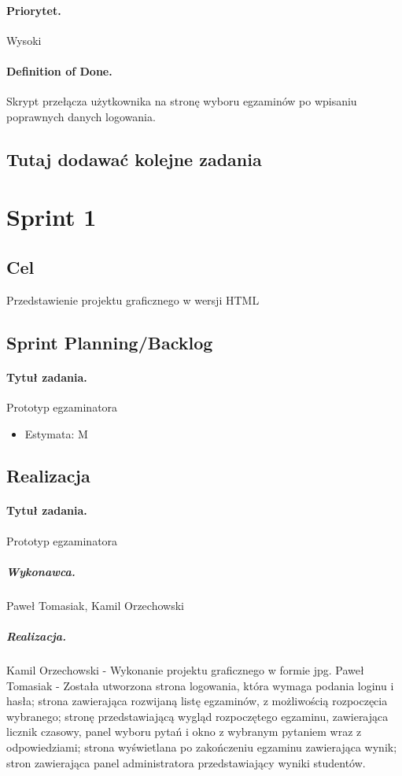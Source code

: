 \documentclass[a4paper]{article}
\begin{document}
\paragraph{Priorytet.} Wysoki
\paragraph{Definition of Done.} Skrypt przełącza użytkownika na stronę wyboru egzaminów po wpisaniu poprawnych danych logowania. 

\subsection*{Tutaj dodawać kolejne zadania}

\section{Sprint 1} 
\subsection{Cel} Przedstawienie projektu graficznego w wersji HTML
\subsection{Sprint Planning/Backlog}

\paragraph{Tytuł zadania.} Prototyp egzaminatora
\begin{itemize}
\item Estymata: M
\end{itemize}

\subsection{Realizacja}

\paragraph{Tytuł zadania.} Prototyp egzaminatora
\subparagraph{Wykonawca.} Paweł Tomasiak, Kamil Orzechowski
\subparagraph{Realizacja.} Kamil Orzechowski - Wykonanie projektu graficznego w formie jpg.
Paweł Tomasiak - Została utworzona strona logowania, która wymaga podania loginu i hasła; strona zawierająca rozwijaną listę egzaminów, z możliwością rozpoczęcia wybranego; stronę przedstawiającą wygląd rozpoczętego egzaminu, zawierająca licznik czasowy, panel wyboru pytań i okno z wybranym pytaniem wraz z odpowiedziami; strona wyświetlana po zakończeniu egzaminu zawierająca wynik; stron zawierająca panel administratora przedstawiający wyniki studentów.
\end{document}
